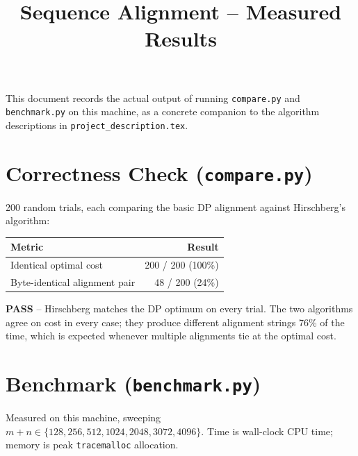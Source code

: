 \documentclass[11pt]{article}
\title{\vspace{-1.5em}Sequence Alignment -- Measured Results}
\author{}
\date{}
\begin{document}
\maketitle
\vspace{-3em}

This document records the actual output of running \texttt{compare.py} and
\texttt{benchmark.py} on this machine, as a concrete companion to the
algorithm descriptions in \texttt{project\_description.tex}.

\section{Correctness Check (\texttt{compare.py})}

200 random trials, each comparing the basic DP alignment against Hirschberg's
algorithm:

\begin{center}
\begin{tabular}{l r}
\toprule
Metric & Result \\
\midrule
Identical optimal cost        & 200 / 200 (100\%) \\
Byte-identical alignment pair & 48 / 200 (24\%) \\
\bottomrule
\end{tabular}
\end{center}

\textbf{PASS} -- Hirschberg matches the DP optimum on every trial. The two
algorithms agree on cost in every case; they produce different alignment
strings 76\% of the time, which is expected whenever multiple alignments tie
at the optimal cost.

\section{Benchmark (\texttt{benchmark.py})}

Measured on this machine, sweeping $m+n \in \{128, 256, 512, 1024, 2048, 3072,
4096\}$. Time is wall-clock CPU time; memory is peak \texttt{tracemalloc}
allocation.
\end{document}
